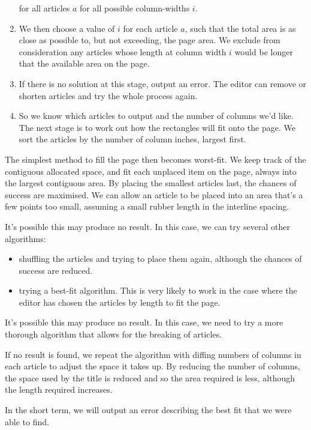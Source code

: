 \documentclass[a4paper]{scrartcl}
\begin{document}
\begin{enumerate}
      for all articles $a$ for all possible column-widths $i$.
    \item We then choose a value of $i$ for each article $a$, such
      that the total area is as close as possible to, but not
      exceeding, the page area. We exclude from consideration any
      articles whose length at column width $i$ would be longer that
      the available area on the page.
    \item If there is no solution at this stage, output an error. The
      editor can remove or shorten articles and try the whole process
      again.
    \item So we know which articles to output and the number of
      columns we'd like. The next stage is to work out how the
      rectangles will fit onto the page. We sort the articles by the
      number of column inches, largest first.
\end{enumerate}

The simplest method to fill the page then becomes worst-fit. We keep
track of the contiguous allocated space, and fit each unplaced item on
the page, always into the largest contiguous area. By placing the
smallest articles last, the chances of success are maximised. We can
allow an article to be placed into an area that's a few points too
small, assuming a small rubber length in the interline spacing.

It's possible this may produce no result. In this case, we can try
several other algorithms:

\begin{itemize}
  \item shuffling the articles and trying to place them again,
    although the chances of success are reduced.
  \item trying a best-fit algorithm. This is very likely to work in
    the case where the editor has chosen the articles by length to fit
    the page.
\end{itemize}

It's possible this may produce no result. In this case, we need to try
a more thorough algorithm that allows for the breaking of articles.

If no result is found, we repeat the algorithm with diffing numbers of
columns in each article to adjust the space it takes up. By reducing
the number of columns, the space used by the title is reduced and so
the area required is less, although the length required increases.

In the short term, we will output an error describing the best fit
that we were able to find.
\end{document}
